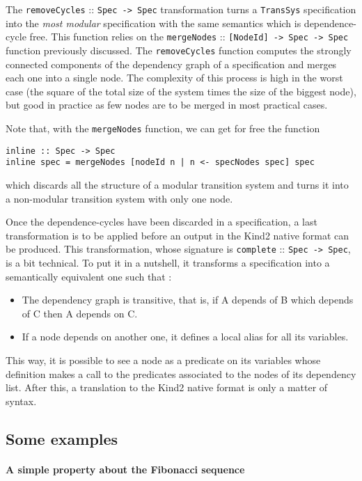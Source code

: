The \texttt{removeCycles} :: \texttt{Spec -> Spec} transformation turns a \texttt{TransSys} specification into the \textit{most modular} specification with the same semantics which is dependence-cycle free. This function relies on the \texttt{mergeNodes} :: \texttt{[NodeId] -> Spec -> Spec} function previously discussed. The \texttt{removeCycles} function computes the strongly connected components of the dependency graph of a specification and merges each one into a single node. The complexity of this process is high in the worst case (the square of the total size of the system times the size of the biggest node), but good in practice as few nodes are to be merged in most practical cases.

Note that, with the \texttt{mergeNodes} function, we can get for free the function
\begin{lstlisting}[frame=single]
inline :: Spec -> Spec
inline spec = mergeNodes [nodeId n | n <- specNodes spec] spec
\end{lstlisting}
which discards all the structure of a modular transition system and turns it into a non-modular transition system with only one node.

\bigskip


Once the dependence-cycles have been discarded in a specification, a last transformation is to be applied before an output in the Kind2 native format can be produced. This transformation, whose signature is  \texttt{complete} :: \texttt{Spec -> Spec}, is a bit technical. To put it in a nutshell, it transforms a specification into a semantically equivalent one such that :

\begin{itemize}
\item The dependency graph is transitive, that is, if A depends of B which depends of C then A depends on C.
\item If a node depends on another one, it defines a local alias for all its variables.
\end{itemize}
This way, it is possible to see a node as a predicate on its variables whose definition makes a call to the predicates associated to the nodes of its dependency list. After this, a translation to the Kind2 native format is only a matter of syntax.

\subsection{Some examples}

\paragraph{A simple property about the Fibonacci sequence}

